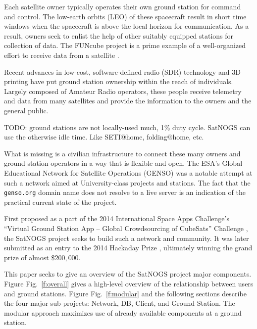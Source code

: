 \documentclass[conference]{IEEEtran}
\newcommand{\figref}[1]{Fig.~\ref{#1}}
\begin{document}
Each satellite owner typically operates their own ground station for command and control.
The low-earth orbits (LEO) of these spacecraft result in short time windows when the spacecraft is above the local horizon for communication.
As a result, owners seek to enlist the help of other suitably equipped stations for collection of data.
The FUNcube project is a prime example of a well-organized effort to receive data from a satellite \cite{FUNcube}.

Recent advances in low-cost, software-defined radio (SDR) technology and 3D printing have put ground station ownership within the reach of individuals.
Largely composed of Amateur Radio operators, these people receive telemetry and data from many satellites and provide the information to the owners and the general public.


TODO: ground stations are not locally-used much, 1\% duty cycle.  SatNOGS can use the otherwise idle time.  Like SETI@home, folding@home, etc.

What is missing is a civilian infrastructure to connect these many owners and ground station operators in a way that is flexible and open.
The ESA's Global Educational Network for Satellite Operations (GENSO) \cite{GENSO} was a notable attempt at such a network aimed at University-class projects and stations.
The fact that the \verb|genso.org| domain name does not resolve to a live server is an indication of the practical current state of the project.

First proposed as a part of the 2014 International Space Apps Challenge's ``Virtual Ground Station App -- Global Crowdsourcing of CubeSats'' Challenge \cite{SpaceAppsChallenge2014-SatNOGS}, the SatNOGS project seeks to build such a network and community.
It was later submitted as an entry to the 2014 Hackaday Prize \cite{Hackaday-SatNOGS}, ultimately winning the grand prize of almost $\$200,000$.

This paper seeks to give an overview of the SatNOGS project major components.
Figure \figref{f:overall} gives a high-level overview of the relationship between users and ground stations.
Figure \figref{f:modular} and the following sections describe the four major sub-projects: Network, DB, Client, and Ground Station.
The modular approach maximizes use of already available components at a ground station.
\end{document}
